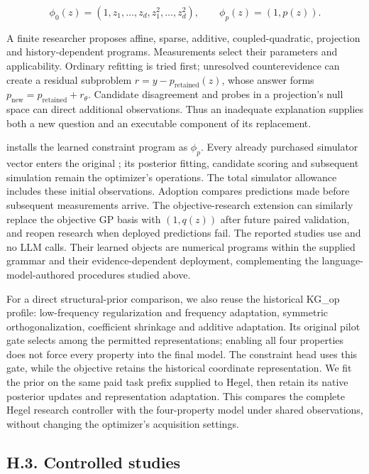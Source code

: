 \documentclass[11pt,a4paper]{article}
\begin{document}
\[
\phi_0(z)=(1,z_1,\ldots,z_d,z_1^2,\ldots,z_d^2),
\qquad \phi_p(z)=(1,p(z)).
\]


A finite researcher proposes affine, sparse, additive, coupled-quadratic,
projection and history-dependent programs. Measurements select their parameters
and applicability. Ordinary refitting is tried first; unresolved counterevidence
can create a residual subproblem \(r=y-p_{\mathrm{retained}}(z)\), whose answer
forms \(p_{\mathrm{new}}=p_{\mathrm{retained}}+r_\theta\). Candidate disagreement
and probes in a projection's null space can direct additional observations.
Thus an inadequate explanation supplies both a new question and an executable
component of its replacement.


 installs the learned constraint program as \(\phi_p\).
Every already purchased simulator vector enters the original
; its posterior fitting, candidate scoring and subsequent
simulation remain the optimizer's operations. The total simulator allowance
includes these initial observations. Adoption compares predictions made before
subsequent measurements arrive. The objective-research extension can similarly
replace the objective GP basis with \((1,q(z))\) after future paired validation,
and reopen research when deployed predictions fail. The reported studies use
 and no LLM calls. Their learned objects are numerical programs
within the supplied grammar and their evidence-dependent deployment, complementing
the language-model-authored procedures studied above.


For a direct structural-prior comparison, we also reuse the historical KG\_op
 profile: low-frequency regularization and frequency adaptation, symmetric
orthogonalization, coefficient shrinkage and additive adaptation. Its original
pilot gate selects among the permitted representations; enabling all four
properties does not force every property into the final model. The constraint
head uses this gate, while the objective retains the historical coordinate
representation. We fit the prior on the same paid task prefix supplied to Hegel,
then retain its native posterior updates and representation adaptation. This
compares the complete Hegel research controller with the four-property model
under shared observations, without changing the optimizer's acquisition settings.


\subsection*{H.3. Controlled studies}
\end{document}

